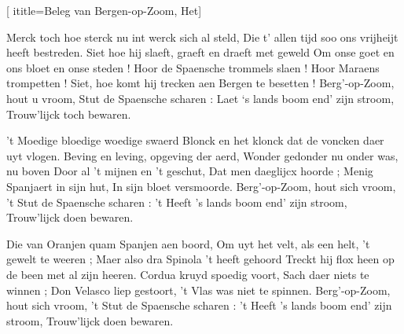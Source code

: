 [
  ititle={Beleg van Bergen-op-Zoom, Het}]

  
\beginverse
Merck toch hoe sterck nu int werck sich al steld,
Die t' allen tijd soo ons vrijheijt heeft bestreden.
Siet hoe hij slaeft, graeft en draeft met geweld
Om onse goet en ons bloet en onse steden !
Hoor de Spaensche trommels slaen !
Hoor Maraens trompetten !
Siet, hoe komt hij trecken aen
Bergen te besetten !
Berg’-op-Zoom, hout u vroom,
Stut de Spaensche scharen :
Laet ‘s lands boom end' zijn stroom,
Trouw'lijck toch bewaren.
\endverse

\beginverse
't Moedige bloedige woedige swaerd
Blonck en het klonck dat de voncken daer uyt vlogen.
Beving en leving, opgeving der aerd,
Wonder gedonder nu onder was, nu boven
Door al 't mijnen en 't geschut,
Dat men daeglijcx hoorde ;
Menig Spanjaert in sijn hut,
In sijn bloet versmoorde.
Berg’-op-Zoom, hout sich vroom,
’t Stut de Spaensche scharen :
't Heeft 's lands boom end' zijn stroom,
Trouw'lijck doen bewaren.
\endverse

\beginverse
Die van Oranjen quam Spanjen aen boord,
Om uyt het velt, als een helt, 't gewelt te weeren ;
Maer also dra Spinola 't heeft gehoord
Treckt hij flox heen op de been met al zijn heeren.
Cordua kruyd spoedig voort,
Sach daer niets te winnen ;
Don Velasco liep gestoort,
't Vlas was niet te spinnen.
Berg’-op-Zoom, hout sich vroom,
’t Stut de Spaensche scharen :
't Heeft 's lands boom end' zijn stroom,
Trouw'lijck doen bewaren.
\endverse

\endsong
